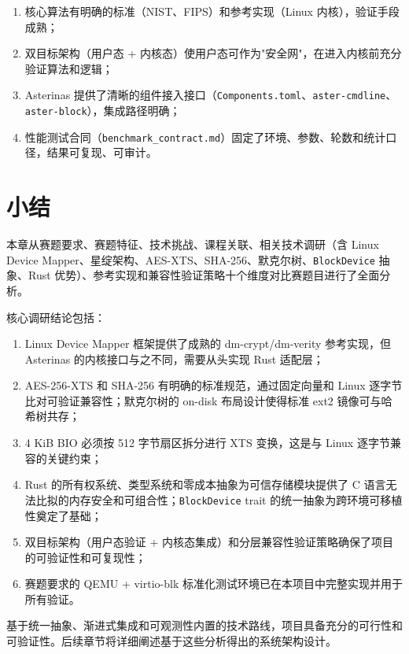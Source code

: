\begin{enumerate}
    \item 核心算法有明确的标准（NIST、FIPS）和参考实现（Linux 内核），验证手段成熟；
    \item 双目标架构（用户态 + 内核态）使用户态可作为"安全网"，在进入内核前充分验证算法和逻辑；
    \item Asterinas 提供了清晰的组件接入接口（\texttt{Components.toml}、\texttt{aster-cmdline}、\texttt{aster-block}），集成路径明确；
    \item 性能测试合同（\texttt{benchmark\_contract.md}）固定了环境、参数、轮数和统计口径，结果可复现、可审计。
\end{enumerate}

\section{小结}

本章从赛题要求、赛题特征、技术挑战、课程关联、相关技术调研（含 Linux Device Mapper、星绽架构、AES-XTS、SHA-256、默克尔树、\texttt{BlockDevice} 抽象、Rust 优势）、参考实现和兼容性验证策略十个维度对比赛题目进行了全面分析。

核心调研结论包括：
\begin{enumerate}
    \item Linux Device Mapper 框架提供了成熟的 dm-crypt/dm-verity 参考实现，但 Asterinas 的内核接口与之不同，需要从头实现 Rust 适配层；
    \item AES-256-XTS 和 SHA-256 有明确的标准规范，通过固定向量和 Linux 逐字节比对可验证兼容性；默克尔树的 on-disk 布局设计使得标准 ext2 镜像可与哈希树共存；
    \item 4 KiB BIO 必须按 512 字节扇区拆分进行 XTS 变换，这是与 Linux 逐字节兼容的关键约束；
    \item Rust 的所有权系统、类型系统和零成本抽象为可信存储模块提供了 C 语言无法比拟的内存安全和可组合性；\texttt{BlockDevice} trait 的统一抽象为跨环境可移植性奠定了基础；
    \item 双目标架构（用户态验证 + 内核态集成）和分层兼容性验证策略确保了项目的可验证性和可复现性；
    \item 赛题要求的 QEMU + virtio-blk 标准化测试环境已在本项目中完整实现并用于所有验证。
\end{enumerate}

基于统一抽象、渐进式集成和可观测性内置的技术路线，项目具备充分的可行性和可验证性。后续章节将详细阐述基于这些分析得出的系统架构设计。
